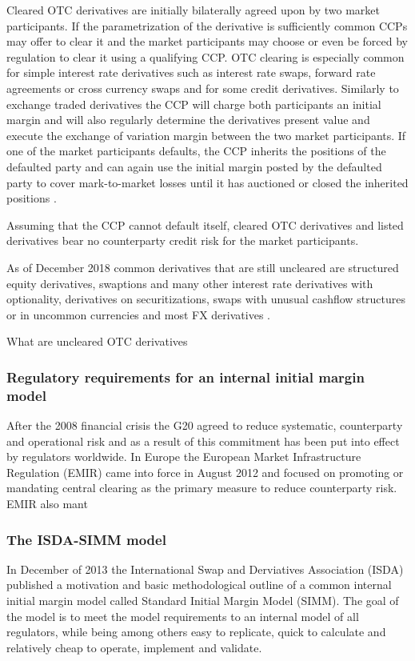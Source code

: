 \documentclass[12pt,a4paper]{article}
\begin{document}
Cleared OTC derivatives are initially bilaterally agreed upon by two market participants. If the parametrization of the derivative is sufficiently common CCPs may offer to clear it and the market participants may choose or even be forced by regulation to clear it using a qualifying CCP. OTC clearing is especially common for simple interest rate derivatives such as interest rate swaps, forward rate agreements or cross currency swaps and for some credit derivatives. Similarly to exchange traded derivatives the CCP will charge both participants an initial margin and will also regularly determine the derivatives present value and execute the exchange of variation margin between the two market participants. If one of the market participants defaults, the CCP inherits the positions of the defaulted party and can again use the initial margin posted by the defaulted party to cover mark-to-market losses until it has auctioned or closed the inherited positions \citep{EurexDMP}.

Assuming that the CCP cannot default itself, cleared OTC derivatives and listed derivatives bear no counterparty credit risk for the market participants.

As of December 2018 common derivatives that are still uncleared are structured equity derivatives, swaptions and many other interest rate derivatives with optionality, derivatives on securitizations, swaps with unusual cashflow structures or in uncommon currencies and most FX derivatives \citep{BISOTCStats}.



What are uncleared OTC derivatives


\subsubsection{Regulatory requirements for an internal initial margin model}
After the 2008 financial crisis the G20 agreed to reduce systematic, counterparty and operational risk and as a result of this commitment has been put into effect by regulators worldwide. In Europe the European Market Infrastructure Regulation (EMIR) came into force in August 2012 and focused on promoting or mandating central clearing as the primary measure to reduce counterparty risk. EMIR also mant

\subsubsection{The ISDA-SIMM model}
In December of 2013 the International Swap and Derviatives Association (ISDA) published a motivation and basic methodological outline of a common internal initial margin model called Standard Initial Margin Model (SIMM\texttrademark)\citep{ISDADec2013}. The goal of the model is to meet the model requirements to an internal model of all regulators, while being among others easy to replicate, quick to calculate and relatively cheap to operate, implement and validate.
\end{document}
